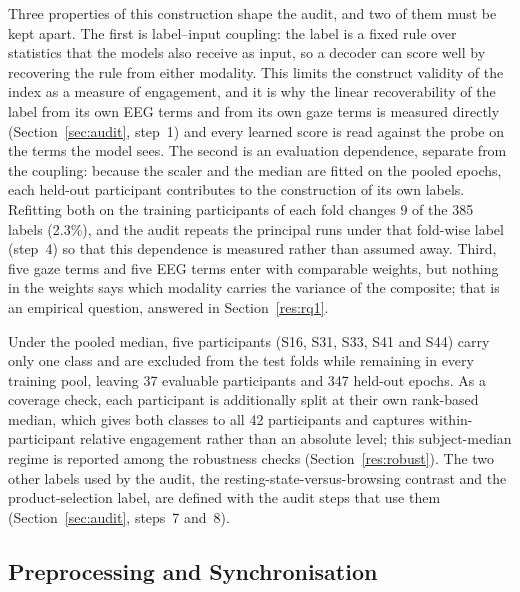 \documentclass[pdflatex,sn-basic,Numbered,twocolumn,iicol]{sn-jnl}
\theoremstyle{thmstyleone}%
\theoremstyle{thmstyletwo}%
\theoremstyle{thmstylethree}%
\begin{document}
Three properties of this construction shape the audit, and two of them must be kept apart. The first is label--input coupling: the label is a fixed rule over statistics that the models also receive as input, so a decoder can score well by recovering the rule from either modality. This limits the construct validity of the index as a measure of engagement, and it is why the linear recoverability of the label from its own EEG terms and from its own gaze terms is measured directly (Section~\ref{sec:audit}, step~1) and every learned score is read against the probe on the terms the model sees. The second is an evaluation dependence, separate from the coupling: because the scaler and the median are fitted on the pooled epochs, each held-out participant contributes to the construction of its own labels. Refitting both on the training participants of each fold changes 9 of the 385 labels (2.3\%), and the audit repeats the principal runs under that fold-wise label (step~4) so that this dependence is measured rather than assumed away. Third, five gaze terms and five EEG terms enter with comparable weights, but nothing in the weights says which modality carries the variance of the composite; that is an empirical question, answered in Section~\ref{res:rq1}.

Under the pooled median, five participants (S16, S31, S33, S41 and S44) carry only one class and are excluded from the test folds while remaining in every training pool, leaving 37 evaluable participants and 347 held-out epochs. As a coverage check, each participant is additionally split at their own rank-based median, which gives both classes to all 42 participants and captures within-participant relative engagement rather than an absolute level; this subject-median regime is reported among the robustness checks (Section~\ref{res:robust}). The two other labels used by the audit, the resting-state-versus-browsing contrast and the product-selection label, are defined with the audit steps that use them (Section~\ref{sec:audit}, steps~7 and~8).

\subsection{Preprocessing and Synchronisation}\label{sec:preproc}
\end{document}

